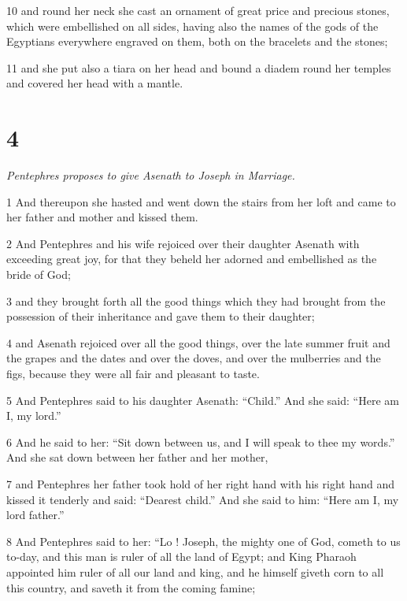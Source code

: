 \par 10 and round her neck she cast an ornament of great price and precious stones, which were embellished on all sides, having also the names of the gods of the Egyptians everywhere engraved on them, both on the bracelets and the stones; 

\par 11 and she put also a tiara on her head and bound a diadem round her temples and covered her head with a mantle. 

\chapter{4}

\textit{Pentephres proposes to give Asenath to Joseph in Marriage.}

\par 1 And thereupon she hasted and went down the stairs from her loft and came to her father and mother and kissed them. 

\par 2 And Pentephres and his wife rejoiced over their daughter Asenath with exceeding great joy, for that they beheld her adorned and embellished as the bride of God; 

\par 3 and they brought forth all the good things which they had brought from the possession of their inheritance and gave them to their daughter; 

\par 4 and Asenath rejoiced over all the good things, over the late summer fruit and the grapes and the dates and over the doves, and over the mulberries and the figs, because they were all fair and pleasant to taste. 

\par 5 And Pentephres said to his daughter Asenath: “Child.” And she said: “Here am I, my lord.” 

\par 6 And he said to her: “Sit down between us, and I will speak to thee my words.” And she sat down between her father and her mother, 

\par 7 and Pentephres her father took hold of her right hand with his right hand and kissed it tenderly and said: “Dearest child.” And she said to him: “Here am I, my lord father.” 

\par 8 And Pentephres said to her: “Lo ! Joseph, the mighty one of God, cometh to us to-day, and this man is ruler of all the land of Egypt; and King Pharaoh appointed him ruler of all our land and king, and he himself giveth corn to all this country, and saveth it from the coming famine; 

